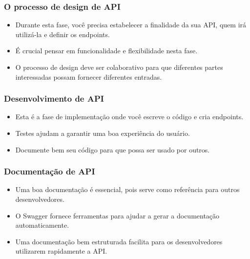 \documentclass{beamer}
\begin{document}
\begin{frame}
\frametitle{O processo de design de API}


\begin{itemize}
\item Durante esta fase, você precisa estabelecer a finalidade da sua API, quem irá utilizá-la e definir os endpoints.
\item É crucial pensar em funcionalidade e flexibilidade nesta fase.
\item O processo de design deve ser colaborativo para que diferentes partes interessadas possam fornecer diferentes entradas.
\end{itemize}

\end{frame}

\begin{frame}
\frametitle{Desenvolvimento de API}


\begin{itemize}
\item Esta é a fase de implementação onde você escreve o código e cria endpoints.
\item Testes ajudam a garantir uma boa experiência do usuário.
\item Documente bem seu código para que possa ser usado por outros.
\end{itemize}

\end{frame}

\begin{frame}
\frametitle{Documentação de API}


\begin{itemize}
\item Uma boa documentação é essencial, pois serve como referência para outros desenvolvedores.
\item O Swagger fornece ferramentas para ajudar a gerar a documentação automaticamente.
\item Uma documentação bem estruturada facilita para os desenvolvedores utilizarem rapidamente a API.
\end{itemize}

\end{frame}
\end{document}
